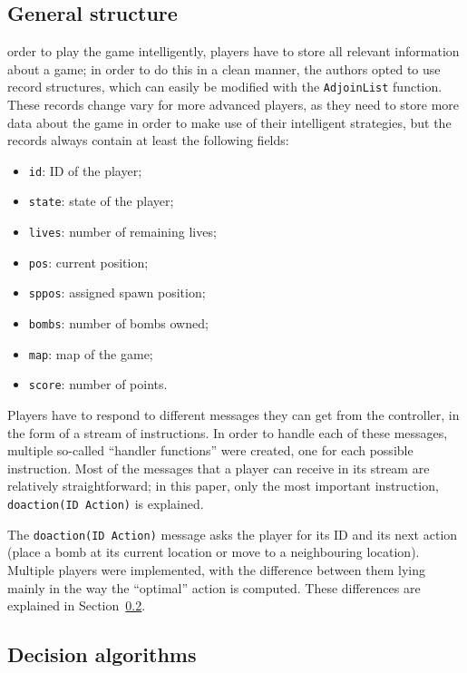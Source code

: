 \documentclass[12pt,journal]{IEEEtran}
\begin{document}
\subsection{General structure}
 order to play the game intelligently, players have to store all relevant information about a game; in order to do this in a clean manner, the authors opted to use record structures, which can easily be modified with the \lstinline|AdjoinList| function.
These records change vary for more advanced players, as they need to store more data about the game in order to make use of their intelligent strategies, but the records always contain at least the following fields:
\begin{itemize}
	\item \lstinline|id|: ID of the player;
	\item \lstinline|state|: state of the player;
	\item \lstinline|lives|: number of remaining lives;
	\item \lstinline|pos|: current position;
	\item \lstinline|sppos|: assigned spawn position;
	\item \lstinline|bombs|: number of bombs owned;
	\item \lstinline|map|: map of the game;
	\item \lstinline|score|: number of points.
\end{itemize}

Players have to respond to different messages they can get from the controller, in the form of a stream of instructions.
In order to handle each of these messages, multiple so-called ``handler functions'' were created, one for each possible instruction.
Most of the messages that a player can receive in its stream are relatively straightforward; in this paper, only the most important instruction, \lstinline|doaction(ID Action)| is explained.

The \lstinline|doaction(ID Action)| message asks the player for its ID and its next action (place a bomb at its current location or move to a neighbouring location).
Multiple players were implemented, with the difference between them lying mainly in the way the ``optimal'' action is computed.
These differences are explained in Section~\ref{sec:playerai}.

\subsection{Decision algorithms}
\label{sec:playerai}
\end{document}
